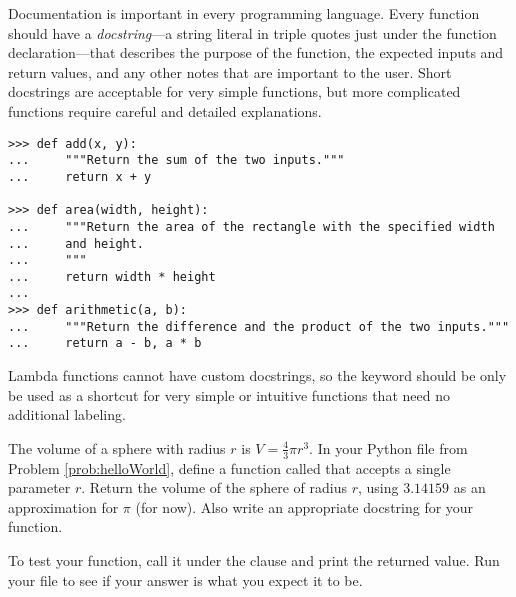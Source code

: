 \begin{info}
Documentation is important in every programming language.
Every function should have a \emph{docstring}---a string literal in triple quotes just under the function declaration---that describes the purpose of the function, the expected inputs and return values, and any other notes that are important to the user.
Short docstrings are acceptable for very simple functions, but more complicated functions require careful and detailed explanations.

\begin{lstlisting}
>>> def add(x, y):
...     """Return the sum of the two inputs."""
...     return x + y

>>> def area(width, height):
...     """Return the area of the rectangle with the specified width
...     and height.
...     """
...     return width * height
...
>>> def arithmetic(a, b):
...     """Return the difference and the product of the two inputs."""
...     return a - b, a * b
\end{lstlisting}

Lambda functions cannot have custom docstrings, so the  keyword should be only be used as a shortcut for very simple or intuitive functions that need no additional labeling.
\end{info}

\begin{problem} %
The volume of a sphere with radius $r$ is $V = \frac{4}{3}\pi r^3$.
In your Python file from Problem \ref{prob:helloWorld}, define a function called  that accepts a single parameter $r$.
Return the volume of the sphere of radius $r$, using $3.14159$ as an approximation for $\pi$ (for now).
Also write an appropriate docstring for your function.

To test your function, call it under the  clause and print the returned value.
Run your file to see if your answer is what you expect it to be.
\end{problem}

